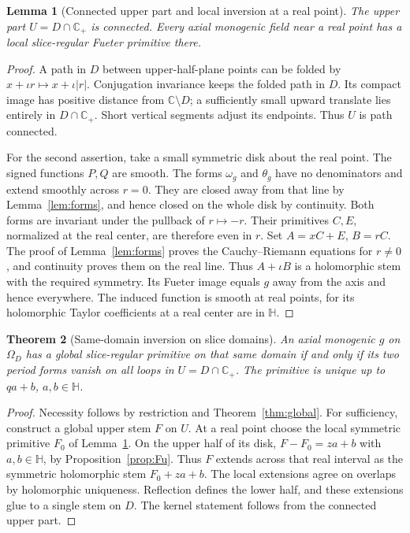 \documentclass[11pt,a4paper]{article}
\numberwithin{equation}{section}
\newtheorem{theorem}{Theorem}[section]
\newtheorem{lemma}[theorem]{Lemma}
\theoremstyle{definition}
\theoremstyle{remark}
\newcommand{\C}{\mathbb C}
\newcommand{\HH}{\mathbb H}
\newcommand{\Cp}{\C_+}
\begin{document}
\begin{lemma}[Connected upper part and local inversion at a real point]
\label{lem:real-local}
The upper part $U=D\cap\Cp$ is connected. Every axial monogenic field
near a real point has a local slice-regular Fueter primitive there.
\end{lemma}
\begin{proof}
A path in $D$ between upper-half-plane points can be folded by
$x+\iota r\mapsto x+\iota|r|$. Conjugation invariance keeps the folded
path in $D$. Its compact image has positive distance from $\C\setminus D$;
a sufficiently small upward translate lies entirely in $D\cap\Cp$.
Short vertical segments adjust its endpoints. Thus $U$ is path connected.

For the second assertion, take a small symmetric disk about the real
point. The signed functions $P,Q$ are smooth. The forms $\omega_g$ and
$\theta_g$ have no denominators and extend smoothly across $r=0$.
They are closed away from that line by Lemma~\ref{lem:forms}, and hence
closed on the whole disk by continuity. Both forms are invariant under
the pullback of $r\mapsto-r$. Their primitives $C,E$, normalized at the
real center, are therefore even in $r$. Set $A=xC+E$, $B=rC$.
The proof of Lemma~\ref{lem:forms} proves the Cauchy--Riemann equations
for $r\ne0$, and continuity proves them on the real line. Thus
$A+\iota B$ is a holomorphic stem with the required symmetry.
Its Fueter image equals $g$ away from the axis and hence everywhere.
The induced function is smooth at real points, for its holomorphic Taylor
coefficients at a real center are in $\HH$.
\end{proof}

\begin{theorem}[Same-domain inversion on slice domains]\label{thm:real}
An axial monogenic $g$ on $\Omega_D$ has a global slice-regular primitive
on \emph{that same domain} if and only if its two period forms vanish
on all loops in $U=D\cap\Cp$. The primitive is unique up to $qa+b$,
$a,b\in\HH$.
\end{theorem}
\begin{proof}
Necessity follows by restriction and Theorem~\ref{thm:global}.
For sufficiency, construct a global upper stem $F$ on $U$. At a real
point choose the local symmetric primitive $F_0$ of
Lemma~\ref{lem:real-local}. On the upper half of its disk,
$F-F_0=za+b$ with $a,b\in\HH$, by Proposition~\ref{prop:Fu}.
Thus $F$ extends across that real interval as the symmetric holomorphic
stem $F_0+za+b$. The local extensions agree on overlaps by holomorphic
uniqueness. Reflection defines the lower half, and these extensions glue
to a single stem on $D$. The kernel statement follows from the connected
upper part.
\end{proof}
\end{document}
